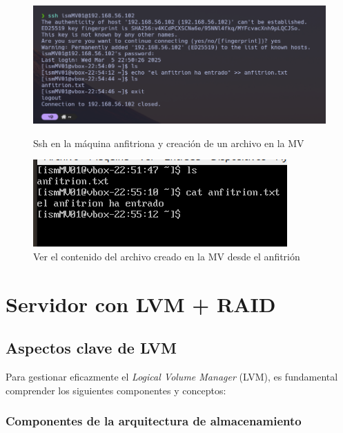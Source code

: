 \begin{figure}[htbp]
    \centering
    \begin{minipage}[b]{0.45\textwidth}
        \centering
        \includegraphics[width=\textwidth]{images/Bloque1/ssh1.png}
        \caption{Ssh en la máquina anfitriona y creación de un archivo en la MV}
    \end{minipage}
    \hfill
    \begin{minipage}[b]{0.45\textwidth}
        \centering
        \includegraphics[width=\textwidth]{images/Bloque1/ssh2.png}
        \caption{Ver el contenido del archivo creado en la MV desde el anfitrión}
    \end{minipage}
\end{figure}
\newpage
\section{Servidor con LVM + RAID}

\subsection{Aspectos clave de LVM}

Para gestionar eficazmente el \textit{Logical Volume Manager} (LVM), es fundamental comprender los siguientes componentes y conceptos:

\subsubsection{Componentes de la arquitectura de almacenamiento}

